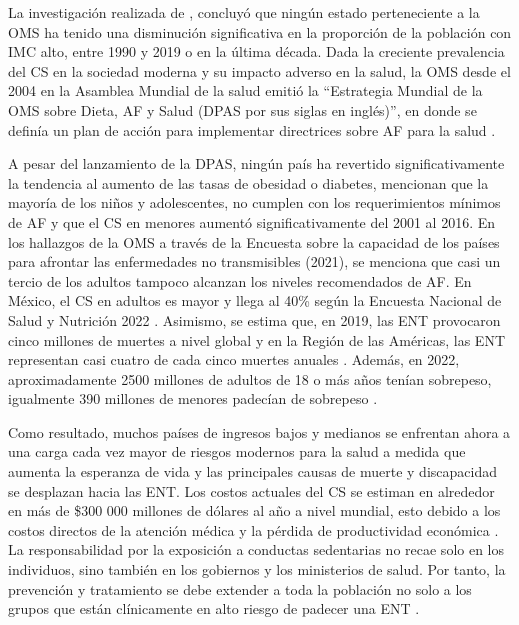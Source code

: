 La investigación realizada de \citet{Murray2020GBD}, concluyó que ningún estado perteneciente a la OMS ha tenido una disminución significativa en la proporción de la población con IMC alto, entre 1990 y 2019 o en la última década. Dada la creciente prevalencia del CS en la sociedad moderna y su impacto adverso en la salud, la OMS desde el 2004 en la Asamblea Mundial de la salud emitió la ``Estrategia Mundial de la OMS sobre Dieta, AF y Salud (DPAS por sus siglas en inglés)'', en donde se definía un plan de acción para implementar directrices sobre AF para la salud \citep{Meusel2006Framework}.

A pesar del lanzamiento de la DPAS, ningún país ha revertido significativamente la tendencia al aumento de las tasas de obesidad o diabetes, \citet{Guthold2020} mencionan que la mayoría de los niños y adolescentes, no cumplen con los requerimientos mínimos de AF y que el CS en menores aumentó significativamente del 2001 al 2016. En los hallazgos de la OMS a través de la Encuesta sobre la capacidad de los países para afrontar las enfermedades no transmisibles (2021), se menciona que casi un tercio de los adultos tampoco alcanzan los niveles recomendados de AF. En México, el CS en adultos es mayor y llega al 40\% según la Encuesta Nacional de Salud y Nutrición 2022 \citep{Campos2023ObesityMexico}. Asimismo, se estima que, en 2019, las ENT provocaron cinco millones de muertes a nivel global y en la Región de las Américas, las ENT representan casi cuatro de cada cinco muertes anuales \citep{StrategicPlanPAHO2020}. Además, en 2022, aproximadamente 2500 millones de adultos de 18 o más años tenían sobrepeso, igualmente 390 millones de menores padecían de sobrepeso \citep{WHO2022InformeActividad}.

Como resultado, muchos países de ingresos bajos y medianos se enfrentan ahora a una carga cada vez mayor de riesgos modernos para la salud a medida que aumenta la esperanza de vida y las principales causas de muerte y discapacidad se desplazan hacia las ENT. Los costos actuales del CS se estiman en alrededor en más de \$300 000 millones de dólares al año a nivel mundial, esto debido a los costos directos de la atención médica y la pérdida de productividad económica \citep{Okunogbe2021Economic}. La responsabilidad por la exposición a conductas sedentarias no recae solo en los individuos, sino también en los gobiernos y los ministerios de salud. Por tanto, la prevención y tratamiento se debe extender a toda la población no solo a los grupos que están clínicamente en alto riesgo de padecer una ENT \citep{WHO2009GlobalRisks}.

